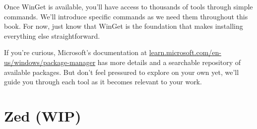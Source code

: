 \documentclass[
  letterpaper,
  DIV=11,
  numbers=noendperiod]{scrreprt}
\begin{document}
Once WinGet is available, you'll have access to thousands of tools
through simple commands. We'll introduce specific commands as we need
them throughout this book. For now, just know that WinGet is the
foundation that makes installing everything else straightforward.

If you're curious, Microsoft's documentation at
\href{https://learn.microsoft.com/en-us/windows/package-manager/}{learn.microsoft.com/en-us/windows/package-manager}
has more details and a searchable repository of available packages. But
don't feel pressured to explore on your own yet, we'll guide you through
each tool as it becomes relevant to your work.

\chapter{Zed (WIP)}\label{zed-wip}
\end{document}
